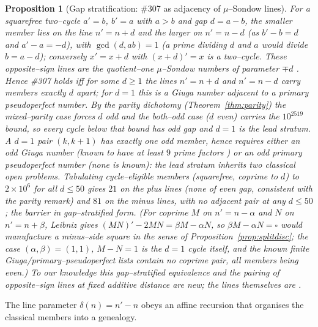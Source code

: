 \documentclass[11pt]{article}
\newtheorem{proposition}[theorem]{Proposition}
\theoremstyle{definition}
\begin{document}
\begin{proposition}[Gap stratification: \#307 as adjacency of $\mu$--Sondow lines]\label{prop:gap}
For a squarefree two--cycle $a'=b$, $b'=a$ with $a>b$ and gap $d=a-b$, the smaller member lies on the line
$n'=n+d$ and the larger on $n'=n-d$ (as $b'-b=d$ and $a'-a=-d$), with $\gcd(d,ab)=1$ (a prime dividing $d$
and $a$ would divide $b=a-d$); conversely $x'=x+d$ with $(x+d)'=x$ is a two--cycle. These opposite--sign
lines are the quotient--one $\mu$--Sondow numbers of parameter $\mp d$ \cite{GrauOllerMarcenSadornil2021}.
Hence \#307 holds iff for some $d\ge1$ the lines $n'=n+d$ and $n'=n-d$ carry members exactly $d$ apart; for
$d=1$ this is \emph{a Giuga number adjacent to a primary pseudoperfect number}. By the parity dichotomy
(Theorem~\ref{thm:parity}) the mixed--parity case forces $d$ odd and the both--odd case ($d$ even) carries
the $10^{2519}$ bound, so every cycle below that bound has odd gap and $d=1$ is the lead stratum. A $d=1$
pair $(k,k+1)$ has exactly one odd member, hence requires either an odd Giuga number (known to have at least
$9$ prime factors \cite{BBBG1996,BorweinWong1997}) or an odd primary pseudoperfect number (none is known):
the lead stratum inherits two classical open problems. Tabulating cycle--eligible members (squarefree,
coprime to $d$) to $2\times10^6$ for all $d\le50$ gives $21$ on the plus lines (none of even gap, consistent
with the parity remark) and $81$ on the minus lines, with \emph{no} adjacent pair at any $d\le50$; the
barrier in gap--stratified form. \textup{(}For coprime $M$ on $n'=n-\alpha$ and $N$ on $n'=n+\beta$, Leibniz
gives $(MN)'-2MN=\beta M-\alpha N$, so $\beta M-\alpha N=\square$ would manufacture a minus--side square in
the sense of Proposition~\ref{prop:splitdisc}; the case $(\alpha,\beta)=(1,1)$, $M-N=1$ is the $d=1$ cycle
itself, and the known finite Giuga/primary--pseudoperfect lists contain no coprime pair, all members being
even.\textup{)} To our knowledge this gap--stratified equivalence and the pairing of opposite--sign lines at
fixed additive distance are new; the lines themselves are \cite{GrauOllerMarcenSadornil2021}.
\end{proposition}

The line parameter $\delta(n)=n'-n$ obeys an affine recursion that organises the classical members into a
genealogy.
\end{document}
